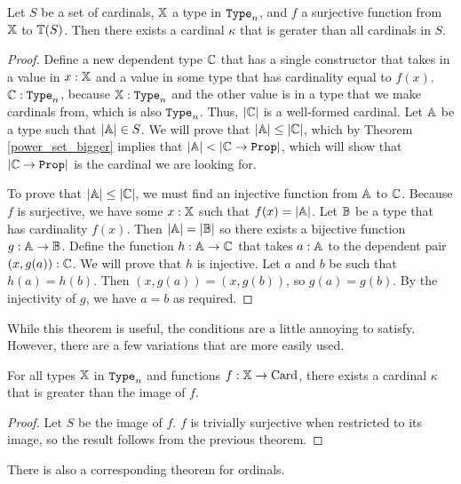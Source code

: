 \documentclass[../../math.tex]{subfiles}
\begin{document}
\begin{theorem} \label{card_large_set}
    Let $S$ be a set of cardinals, $\mathbb{X}$ a type in $\Type_n$, and $f$ a
    surjective function from $\mathbb{X}$ to $\mathbb{T}(S)$.  Then there exists a cardinal
    $\kappa$ that is gerater than all cardinals in $S$.
\end{theorem}
\begin{proof}
    Define a new dependent type $\mathbb{C}$ that has a single constructor that takes in
    a value in $x : \mathbb{X}$ and a value in some type that has cardinality equal to
    $f(x)$.  $\C : \Type_n$, because $\X : \Type_n$ and the other value is in a
    type that we make cardinals from, which is also $\Type_n$.  Thus, $|\mathbb{C}|$ is
    a well-formed cardinal.  Let $\mathbb{A}$ be a type such that $|\mathbb{A}| \in S$.  We will
    prove that $|\mathbb{A}| \leq |\mathbb{C}|$, which by Theorem \ref{power_set_bigger} implies
    that $|\A| < |\C \to \Prop|$, which will show that $|\C \to \Prop|$ is the
    cardinal we are looking for.

    To prove that $|\mathbb{A}| \leq |\mathbb{C}|$, we must find an injective function from
    $\mathbb{A}$ to $\mathbb{C}$.  Because $f$ is surjective, we have some $x : \mathbb{X}$ such that
    $f(x) = |\mathbb{A}|$.  Let $\mathbb{B}$ be a type that has cardinality $f(x)$.  Then $|\mathbb{A}|
    = |\mathbb{B}|$ so there exists a bijective function $g : \mathbb{A} \to \mathbb{B}$.  Define the
    function $h : \mathbb{A} \to \mathbb{C}$ that takes $a : \mathbb{A}$ to the dependent pair $(x,
    g(a)) : \mathbb{C}$.  We will prove that $h$ is injective.  Let $a$ and $b$ be such
    that $h(a) = h(b)$.  Then $(x, g(a)) = (x, g(b))$, so $g(a) = g(b)$.  By the
    injectivity of $g$, we have $a = b$ as required.
\end{proof}

While this theorem is useful, the conditions are a little annoying to satisfy.
However, there are a few variations that are more easily used.

\begin{theorem} \label{card_large}
    For all types $\mathbb{X}$ in $\Type_n$ and functions $f : \mathbb{X} \to \operatorname{Card}$, there
    exists a cardinal $\kappa$ that is greater than the image of $f$.
\end{theorem}
\begin{proof}
    Let $S$ be the image of $f$.  $f$ is trivially surjective when restricted to
    its image, so the result follows from the previous theorem.
\end{proof}

There is also a corresponding theorem for ordinals.
\end{document}
